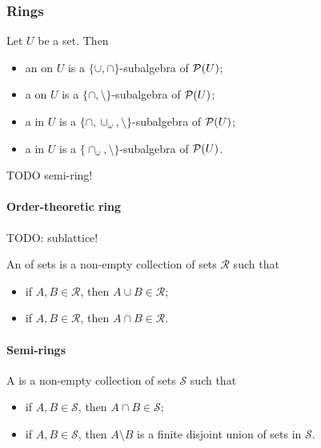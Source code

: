 \subsubsection{Rings}
\begin{definition}
Let $U$ be a set. Then
\begin{itemize}
\item an  on $U$ is a $\{\cup,\cap\}$-subalgebra of $\operatorname{\mathcal{P}}(U)$;
\item a  on $U$ is a $\{\cap,\setminus\}$-subalgebra of $\operatorname{\mathcal{P}}(U)$;
\item a  in $U$ is a $\{\cap, \cup_\omega,\setminus\}$-subalgebra of $\operatorname{\mathcal{P}}(U)$;
\item a  in $U$ is a $\{\cap_\omega,\setminus\}$-subalgebra of $\operatorname{\mathcal{P}}(U)$.
\end{itemize}
\end{definition}
TODO semi-ring!


\paragraph{Order-theoretic ring}
TODO: sublattice!
\begin{definition}
An  of sets is a non-empty collection of sets $\mathcal{R}$ such that
\begin{itemize}
\item if $A,B\in \mathcal{R}$, then $A\cup B\in \mathcal{R}$;
\item if $A,B\in \mathcal{R}$, then $A\cap B\in \mathcal{R}$.
\end{itemize}
\end{definition}

\paragraph{Semi-rings}
\begin{definition}
A  is a non-empty collection of sets $\mathcal{S}$ such that
\begin{itemize}
\item if $A,B\in \mathcal{S}$, then $A\cap B\in \mathcal{S}$;
\item if $A,B\in \mathcal{S}$, then $A\setminus B$ is a finite disjoint union of sets in $\mathcal{S}$.
\end{itemize}
\end{definition}

